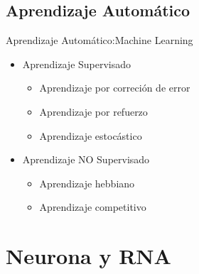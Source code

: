 \documentclass{beamer}
\begin{document}
\subsection{Aprendizaje Automático}
\begin{frame}{Aprendizaje Automático:}{Machine Learning}
\begin{itemize}
\item {Aprendizaje Supervisado\pause}
\begin{itemize}
\item {Aprendizaje por correción de error\pause}
\item {Aprendizaje por refuerzo\pause}
\item {Aprendizaje estocástico\pause}
\end{itemize}
\item {Aprendizaje NO Supervisado\pause}
\begin{itemize}
\item {Aprendizaje hebbiano\pause}
\item {Aprendizaje competitivo}
\end{itemize}
\end{itemize}
\end{frame}

\section{Neurona y RNA}
\end{document}

